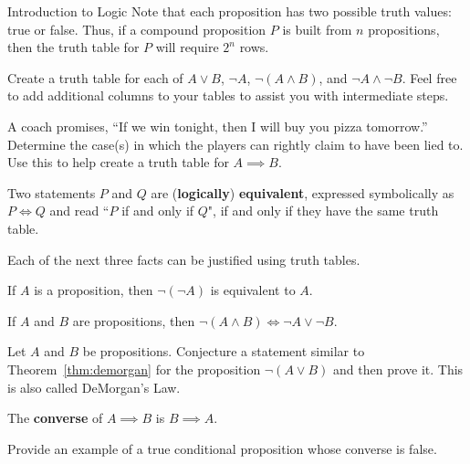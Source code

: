\begin{section}{Introduction to Logic}
Note that each proposition has two possible truth values: true or false. Thus, if a compound proposition $P$ is built from $n$ propositions, then the truth table for $P$ will require $2^n$ rows.

\begin{problem}
Create a truth table for each of $A \vee B$, $\neg A$, $\neg (A \wedge B)$, and $\neg A \wedge \neg B$.  Feel free to add additional columns to your tables to assist you with intermediate steps.
\end{problem}

\begin{problem}
A coach promises, ``If we win tonight, then I will buy you pizza tomorrow.''  Determine the case(s) in which the players can rightly claim to have been lied to. Use this to help create a truth table for $A \implies B$.
\end{problem}

\begin{definition}
Two statements $P$ and $Q$ are (\textbf{logically}) \textbf{equivalent}, expressed symbolically as $\boxed{P\iff Q}$ and read ``$P$ if and only if $Q$", if and only if they have the same truth table.
\end{definition}

Each of the next three facts can be justified using truth tables.

\begin{theorem}
If $A$ is a proposition, then $\neg(\neg A)$ is equivalent to $A$.
\end{theorem}

\begin{theorem}\label{thm:demorgan}
If $A$ and $B$ are propositions, then $\neg(A \wedge B) \iff \neg A \vee \neg B$.
\end{theorem}

\begin{problem}
Let $A$ and $B$ be propositions.  Conjecture a statement similar to Theorem~\ref{thm:demorgan} for the proposition $\neg(A\vee B)$ and then prove it. This is also called DeMorgan's Law.
\end{problem}

\begin{definition}\label{def:converse}
The \textbf{converse} of $A \implies B$ is $B \implies A$.
\end{definition}

\begin{problem}
Provide an example of a true conditional proposition whose converse is false.
\end{problem}


\end{section}
